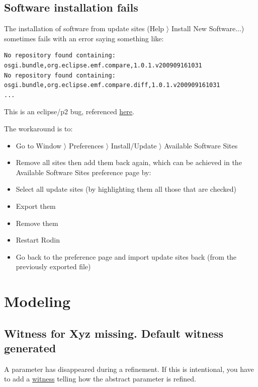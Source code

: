 \subsection{Software installation fails}

The installation of software from update sites (\textsf{Help $\rangle$ Install New Software...}) sometimes fails with an error saying something like: 

\begin{verbatim}
No repository found containing: osgi.bundle,org.eclipse.emf.compare,1.0.1.v200909161031
No repository found containing: osgi.bundle,org.eclipse.emf.compare.diff,1.0.1.v200909161031
...
\end{verbatim}

This is an eclipse/p2 bug, referenced \href{http://stackoverflow.com/questions/511367/error-when-updating-eclipse}{here}. 

The workaround is to: 

\begin{itemize}
	\item Go to \textsf{Window $\rangle$ Preferences $\rangle$ Install/Update $\rangle$ Available Software Sites} 
	\item Remove all sites then add them back again, which can be achieved in the \textsf{Available Software Sites} preference page by: 
	\item Select all update sites (by highlighting them all those that are checked) 
	\item Export them 
	\item Remove them
	\item Restart Rodin
	\item Go back to the preference page and import update sites back (from the previously exported file) 
\end{itemize}

\section{Modeling}

\subsection{Witness for \textsf{Xyz} missing. Default witness generated}

A parameter has disappeared during a refinement. If this is intentional, you have to add a \href{http://wiki.event-b.org/index.php/Witnesses_(Modelling_Language)}{witness} telling how the abstract parameter is refined. 

